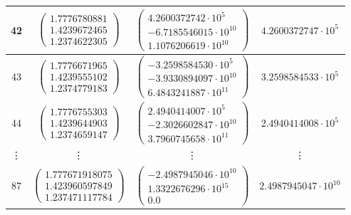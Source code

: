 \documentclass{article}
\begin{document}
\begin{table}[htb]
\begin{tabular}{|c|c|c|c|}
        42     & $\begin{pmatrix} 1.7776780881   \\ 1.4239672465   \\ 1.2374622305   \end{pmatrix}$ & $\begin{pmatrix} 4.2600372742\cdot 10^{5}   \\ -6.7185546015\cdot 10^{10} \\ 1.1076206619\cdot 10^{10}  \end{pmatrix}$ & $ 4.2600372747\cdot 10^{5}$   \\ \hline
        43     & $\begin{pmatrix} 1.7776671965   \\ 1.4239555102   \\ 1.2374779183   \end{pmatrix}$ & $\begin{pmatrix} -3.2598584530\cdot 10^{5}  \\ -3.9330894097\cdot 10^{10} \\ 6.4843241887\cdot 10^{11}  \end{pmatrix}$ & $ 3.2598584533\cdot 10^{5}$   \\ \hline
        44     & $\begin{pmatrix} 1.7776755303   \\ 1.4239644903   \\ 1.2374659147   \end{pmatrix}$ & $\begin{pmatrix} 2.4940414007\cdot 10^{5}   \\ -2.3026602847\cdot 10^{10} \\ 3.7960745658\cdot 10^{11}  \end{pmatrix}$ & $ 2.4940414008\cdot 10^{5}$   \\ \hline
        \vdots & \vdots                                                                             & \vdots                                                                                                                 & \vdots                        \\ \hline
        87     & $\begin{pmatrix} 1.777671918075 \\ 1.423960597849 \\ 1.237471117784 \end{pmatrix}$ & $\begin{pmatrix} -2.4987945046\cdot 10^{10} \\ 1.3322676296\cdot 10^{15}  \\ 0.0                        \end{pmatrix}$ & $ 2.4987945047\cdot 10^{10} $ \\ \hline

\end{tabular}
\end{table}
\end{document}
